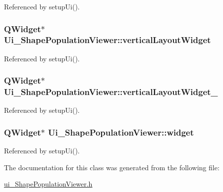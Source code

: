 Referenced by setup\-Ui().

\hypertarget{class_ui___shape_population_viewer_a550f85a97f1beedbb4ed26ff2ad1143b}{
\subsubsection[{vertical\-Layout\-Widget}]{\setlength{\rightskip}{0pt plus 5cm}Q\-Widget$\ast$ Ui\-\_\-\-Shape\-Population\-Viewer\-::vertical\-Layout\-Widget}}\label{class_ui___shape_population_viewer_a550f85a97f1beedbb4ed26ff2ad1143b}


Referenced by setup\-Ui().

\hypertarget{class_ui___shape_population_viewer_a5ab614d7c8de8e7d5c9f347e6a533776}{
\subsubsection[{vertical\-Layout\-Widget\-\_\-3}]{\setlength{\rightskip}{0pt plus 5cm}Q\-Widget$\ast$ Ui\-\_\-\-Shape\-Population\-Viewer\-::vertical\-Layout\-Widget\-\_}}\label{class_ui___shape_population_viewer_a5ab614d7c8de8e7d5c9f347e6a533776}


Referenced by setup\-Ui().

\hypertarget{class_ui___shape_population_viewer_a2e81b3943e7cd43edd0bd6d41b42aef7}{
\subsubsection[{widget}]{\setlength{\rightskip}{0pt plus 5cm}Q\-Widget$\ast$ Ui\-\_\-\-Shape\-Population\-Viewer\-::widget}}\label{class_ui___shape_population_viewer_a2e81b3943e7cd43edd0bd6d41b42aef7}


Referenced by setup\-Ui().



The documentation for this class was generated from the following file\-:\begin{DoxyCompactItemize}
\item 
\hyperlink{ui___shape_population_viewer_8h}{ui\-\_\-\-Shape\-Population\-Viewer.\-h}\end{DoxyCompactItemize}
